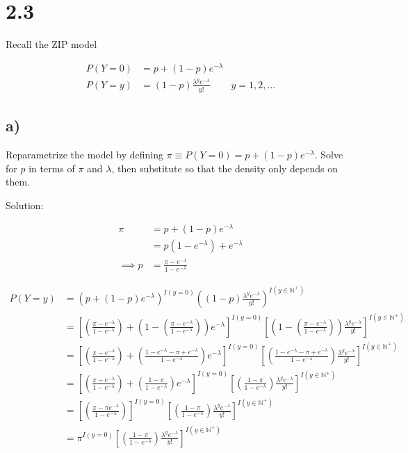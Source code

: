 \documentclass[
  letterpaper,
  DIV=11,
  numbers=noendperiod]{scrreprt}
\begin{document}
\newpage

\hypertarget{section-1}{%
\section{2.3}\label{section-1}}

Recall the ZIP model

\[
\begin{aligned}
P(Y = 0) &= p+(1-p)e^{-\lambda} \\
P(Y=y) &= (1-p)\frac{\lambda^y e^{-\lambda}}{y!} & y=1,2,...
\end{aligned}
\]

\hypertarget{a}{%
\subsection{a)}\label{a}}

Reparametrize the model by defining
\(\pi \equiv P(Y =0) = p+(1-p)e^{-\lambda}\). Solve for \(p\) in terms
of \(\pi\) and \(\lambda\), then substitute so that the density only
depends on them.

Solution:

\[
\begin{aligned}
\pi &= p+(1-p)e^{-\lambda} \\
&=p (1-e^{-\lambda}) + e^{-\lambda} \\
\implies p &= \frac{\pi-e^{-\lambda}}{1-e^{-\lambda}}
\end{aligned}
\]

\[ \begin{aligned}
P(Y = y) &= \left(p+(1-p)e^{-\lambda}\right)^{I(y=0)}\left((1-p)\frac{\lambda^y e^{-\lambda}}{y!}\right)^{I(y \in \mathbb{N}^+)} \\
&= \left[\left( \frac{\pi-e^{-\lambda}}{1-e^{-\lambda}} \right)+ \left(1-\left( \frac{\pi-e^{-\lambda}}{1-e^{-\lambda}} \right)\right)e^{-\lambda}\right]^{I(y=0)}
\left[\left(1-\left( \frac{\pi-e^{-\lambda}}{1-e^{-\lambda}} \right)\right)\frac{\lambda^y e^{-\lambda}}{y!}\right]^{I(y \in \mathbb{N}^+)} \\
&= \left[\left( \frac{\pi-e^{-\lambda}}{1-e^{-\lambda}} \right)+ \left( \frac{1-e^{-\lambda}-\pi+e^{-\lambda}}{1-e^{-\lambda}}\right)e^{-\lambda}\right]^{I(y=0)}
\left[\left( \frac{1-e^{-\lambda}-\pi+e^{-\lambda}}{1-e^{-\lambda}}\right)\frac{\lambda^y e^{-\lambda}}{y!}\right]^{I(y \in \mathbb{N}^+)}\\
&= \left[\left( \frac{\pi-e^{-\lambda}}{1-e^{-\lambda}} \right)+ \left( \frac{1-\pi}{1-e^{-\lambda}}\right)e^{-\lambda}\right]^{I(y=0)}
\left[\left( \frac{1-\pi}{1-e^{-\lambda}}\right)\frac{\lambda^y e^{-\lambda}}{y!}\right]^{I(y \in \mathbb{N}^+)} \\
&= \left[\left( \frac{\pi-\pi e^{-\lambda}}{1-e^{-\lambda}}\right)\right]^{I(y=0)}
\left[\left( \frac{1-\pi}{1-e^{-\lambda}}\right)\frac{\lambda^y e^{-\lambda}}{y!}\right]^{I(y \in \mathbb{N}^+)} \\
&= \pi^{I(y=0)}
\left[\left( \frac{1-\pi}{1-e^{-\lambda}}\right)\frac{\lambda^y e^{-\lambda}}{y!}\right]^{I(y \in \mathbb{N}^+)}
\end{aligned}
\] \newpage
\end{document}
